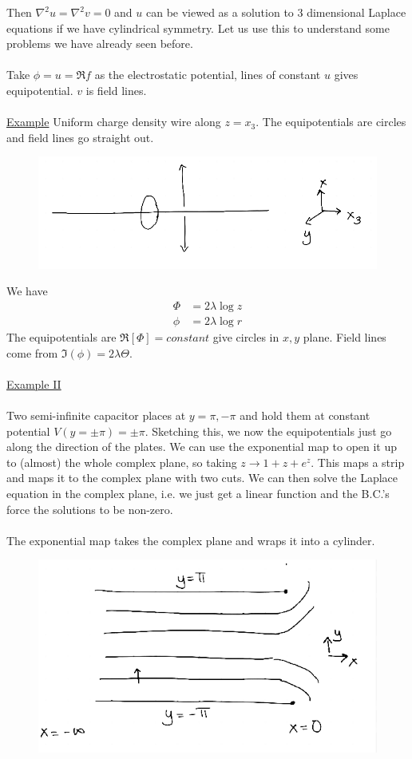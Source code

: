 \documentclass[a4paper,12pt]{article}
\begin{document}
Then $\nabla^2u=\nabla^2 v=0$ and $u$ can be viewed as a solution to 3 dimensional Laplace equations if we have cylindrical symmetry. Let us use this to understand some problems we have already seen before.\\\\
Take $\phi=u= \Re f$ as the electrostatic potential, lines of constant $u$ gives equipotential. $v$ is field lines.\\\\
\underline{Example}
Uniform charge density wire along $z=x_3$. The equipotentials are circles and field lines go straight out.
\begin{figure}[H]
	\centering
	\includegraphics[width=0.7\linewidth]{4}
	\caption{}
	\label{fig:4}
\end{figure}
We have
\begin{equation}
\begin{aligned}
\Phi&=2\lambda \log z\\
\phi&=2\lambda \log r
\end{aligned}
\end{equation}
The equipotentials are $\Re[\Phi]=constant$ give circles in $x,y$ plane. Field lines come from $\Im(\phi)=2\lambda \Theta$.
\\\\
\underline{Example II}
\\\\
Two semi-infinite capacitor places at $y={\pi,-\pi}$ and hold them at constant potential $V(y=\pm \pi)=\pm \pi$. Sketching this, we now the equipotentials just go along the direction of the plates. We can use the exponential map to open it up to (almost) the whole complex plane, so taking $z\to1+z+e^z$. This maps a strip and maps it to the complex plane with two cuts. We can then solve the Laplace equation in the complex plane, i.e. we just get a linear function and the B.C.'s force the solutions to be non-zero.\\\\
The exponential map takes the complex plane and wraps it into a cylinder.
\begin{figure}[H]
	\centering
	\includegraphics[width=0.7\linewidth]{5}
	\caption{}
	\label{fig:4}
\end{figure}
\end{document}
